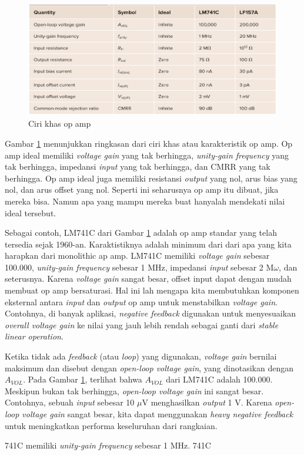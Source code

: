 \begin{figure}
	\centering
	\includegraphics[width=\linewidth]{pic/tab:16.01}
	\caption{Ciri khas op amp}
	\label{tab:16.01}
\end{figure}

Gambar \ref{tab:16.01} menunjukkan ringkasan dari ciri khas atau karakteristik op amp. Op amp ideal memiliki \textit{voltage gain} yang tak berhingga, \textit{unity-gain frequency} yang tak berhingga, impedansi \textit{input} yang tak berhingga, dan CMRR yang tak berhingga. Op amp ideal juga memiliki resistansi \textit{output} yang nol, arus bias yang nol, dan arus offset yang nol. Seperti ini seharusnya op amp itu dibuat, jika mereka bisa. Namun apa yang mampu mereka buat hanyalah mendekati nilai ideal tersebut.

Sebagai contoh, LM741C dari Gambar \ref{tab:16.01} adalah op amp standar yang telah tersedia sejak 1960-an. Karaktistiknya adalah minimum dari dari apa yang kita harapkan dari monolithic ap amp. LM741C memiliki \textit{voltage gain} sebesar 100.000, \textit{unity-gain frequency} sebesar 1 MHz, impedansi \textit{input} sebesar 2 M$\omega$, dan seterusnya. Karena \textit{voltage gain} sangat besar, offset input dapat dengan mudah membuat op amp bersaturasi. Hal ini lah mengapa kita membutuhkan komponen eksternal antara \textit{input} dan \textit{output} op amp untuk menstabilkan \textit{voltage gain}. Contohnya, di banyak aplikasi, \textit{negative feedback} digunakan untuk menyesuaikan \textit{overall voltage gain} ke nilai yang jauh lebih rendah sebagai ganti dari \textit{stable linear operation}.

Ketika tidak ada \textit{feedback} (atau \textit{loop}) yang digunakan, \textit{voltage gain} bernilai maksimum dan disebut dengan \textit{open-loop voltage gain}, yang dinotasikan dengan $ A_{VOL} $. Pada Gambar \ref{tab:16.01}, terlihat bahwa $ A_{VOL} $ dari LM741C adalah 100.000. Meskipun bukan tak berhingga, \textit{open-loop voltage gain} ini sangat besar. Contohnya, sebuah \textit{input} sebesar 10 $\mu$V menghasilkan \textit{output} 1 V. Karena \textit{open-loop voltage gain} sangat besar, kita dapat menggunakan \textit{heavy negative feedback} untuk meningkatkan performa keseluruhan dari rangkaian.

741C memiliki \textit{unity-gain frequency} sebesar 1 MHz. 741C 